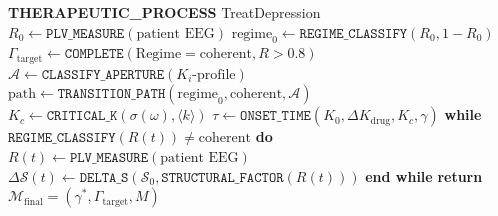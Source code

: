 \documentclass[twocolumn,10pt]{article}
\theoremstyle{remark}
\newcommand{\Rorder}{R}
\newcommand{\Mstate}{\mathcal{M}}
\newcommand{\Gstate}{\Gamma}
\begin{document}
\begin{algorithm}
\caption{Antidepressant Treatment in pNPL}
\label{alg:antidepressant}
\begin{algorithmic}[1]
\State \textbf{THERAPEUTIC\_PROCESS} TreatDepression
\State
\State {}
\State $\Rorder_0 \gets \texttt{PLV\_MEASURE}(\text{patient EEG})$
\State $\text{regime}_0 \gets \texttt{REGIME\_CLASSIFY}(\Rorder_0, 1 - \Rorder_0)$
\State
\State {}
\State $\Gstate_{\mathrm{target}} \gets \texttt{COMPLETE}(\text{Regime} = \text{coherent}, \Rorder > 0.8)$
\State
\State {}
\State $\mathcal{A} \gets \texttt{CLASSIFY\_APERTURE}(K_i\text{-profile})$
\State
\State {}
\State $\text{path} \gets \texttt{TRANSITION\_PATH}(\text{regime}_0, \text{coherent}, \mathcal{A})$
\State
\State {}
\State $K_c \gets \texttt{CRITICAL\_K}(\sigma(\omega), \langle k \rangle)$
\State $\tau \gets \texttt{ONSET\_TIME}(K_0, \Delta K_{\mathrm{drug}}, K_c, \gamma)$
\State
\State {}
\State \textbf{while} $\texttt{REGIME\_CLASSIFY}(\Rorder(t)) \neq \text{coherent}$ \textbf{do}
\State \quad $\Rorder(t) \gets \texttt{PLV\_MEASURE}(\text{patient EEG})$
\State \quad $\Delta\mathcal{S}(t) \gets \texttt{DELTA\_S}(\mathcal{S}_0, \texttt{STRUCTURAL\_FACTOR}(\Rorder(t)))$
\State \textbf{end while}
\State
\State \textbf{return} $\Mstate_{\mathrm{final}} = (\gamma^*, \Gstate_{\mathrm{target}}, M)$
\end{algorithmic}
\end{algorithm}
\end{document}
